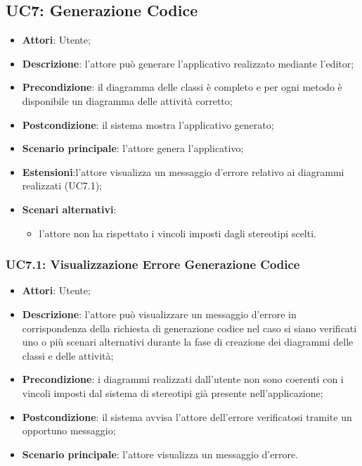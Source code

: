 \subsection{UC7: Generazione Codice}
\label{UC7}
\begin{itemize}
\item \textbf{Attori}: Utente;
\item \textbf{Descrizione}: l'attore può generare l'applicativo realizzato mediante l'editor;
\item \textbf{Precondizione}: il diagramma delle classi è completo e per ogni metodo è disponibile un diagramma delle attività corretto;
\item \textbf{Postcondizione}: il sistema mostra l'applicativo generato;
\item \textbf{Scenario principale}:
l'attore genera l'applicativo;
\item \textbf{Estensioni}:l'attore visualizza un messaggio d'errore relativo ai diagrammi realizzati (UC7.1);
\item \textbf{Scenari alternativi}:
\begin{itemize}
\item l'attore non ha rispettato i vincoli imposti dagli stereotipi scelti.
\end{itemize}
\end{itemize}

\subsubsection{UC7.1: Visualizzazione Errore Generazione Codice}
\label{UC7.1}
\begin{itemize}
\item \textbf{Attori}: Utente;
\item \textbf{Descrizione}: l'attore può visualizzare un messaggio d'errore in corrispondenza della richiesta di generazione codice nel caso si siano verificati uno o più scenari alternativi durante la fase di creazione dei diagrammi delle classi e delle attività;	
\item \textbf{Precondizione}: i diagrammi realizzati dall'utente non sono coerenti con i vincoli imposti dal sistema di stereotipi già presente nell'applicazione;	
\item \textbf{Postcondizione}: il sistema avvisa l'attore dell'errore verificatosi tramite un opportuno messaggio;	
\item \textbf{Scenario principale}:
l'attore visualizza un messaggio d'errore.	
\end{itemize}


